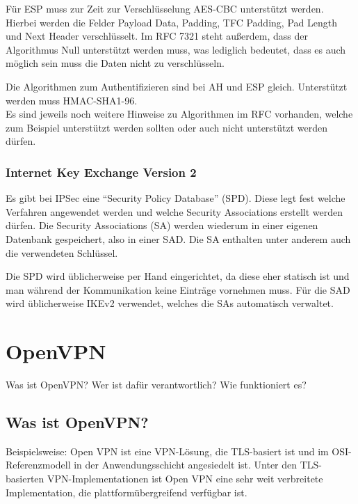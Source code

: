 \documentclass[12pt]{scrartcl}
\begin{document}
Für ESP muss zur Zeit zur Verschlüsselung AES-CBC unterstützt werden. Hierbei werden die Felder Payload Data, Padding, TFC Padding, Pad Length und Next Header verschlüsselt. Im RFC 7321 steht außerdem, dass der Algorithmus Null unterstützt werden muss, was lediglich bedeutet, dass es auch möglich sein muss die Daten nicht zu verschlüsseln.

Die Algorithmen zum Authentifizieren sind bei AH und ESP gleich. Unterstützt werden muss HMAC-SHA1-96.\\
Es sind jeweils noch weitere Hinweise zu Algorithmen im RFC vorhanden, welche zum Beispiel unterstützt werden sollten oder auch nicht unterstützt werden dürfen. 
\subsubsection{Internet Key Exchange Version 2}
Es gibt bei IPSec eine "`Security Policy Database"' (SPD). Diese legt fest welche Verfahren angewendet werden und welche Security Associations erstellt werden dürfen. Die Security Associations (SA) werden wiederum in einer eigenen Datenbank gespeichert, also in einer SAD. Die SA enthalten unter anderem auch die verwendeten Schlüssel.

Die SPD wird üblicherweise per Hand eingerichtet, da diese eher statisch ist und man während der Kommunikation keine Einträge vornehmen muss. Für die SAD wird üblicherweise IKEv2 verwendet, welches die SAs automatisch verwaltet.

\section{OpenVPN}
%
Was ist OpenVPN? Wer ist dafür verantwortlich? Wie funktioniert es?

\subsection{Was ist OpenVPN?}
Beispielsweise:
Open VPN ist eine VPN-Lösung, die TLS-basiert ist und im OSI-Referenzmodell in der Anwendungsschicht angesiedelt ist. Unter den TLS-basierten VPN-Implementationen ist Open VPN eine sehr weit verbreitete Implementation, die plattformübergreifend verfügbar ist.

\end{document}
